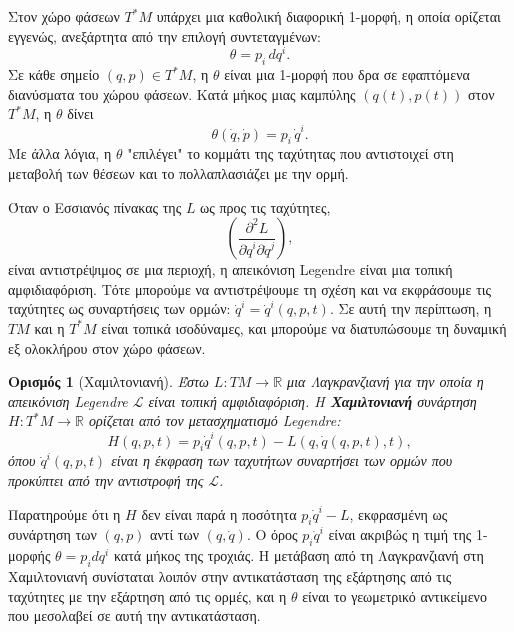 \documentclass[11pt,a4paper,twoside,openright]{book}
\newtheorem{definition}[lemma]{Ορισμός}
\begin{document}
Στον χώρο φάσεων $T^*M$ υπάρχει μια καθολική διαφορική 1-μορφή, η οποία ορίζεται εγγενώς, ανεξάρτητα από την επιλογή συντεταγμένων:
\begin{equation}
\theta = p_i \, dq^i.
\end{equation}
Σε κάθε σημείο $(q, p) \in T^*M$, η $\theta$ είναι μια 1-μορφή που δρα σε εφαπτόμενα διανύσματα του χώρου φάσεων. Κατά μήκος μιας καμπύλης $(q(t), p(t))$ στον $T^*M$, η $\theta$ δίνει
\begin{equation}
\theta(\dot{q}, \dot{p}) = p_i \, \dot{q}^i.
\end{equation}
Με άλλα λόγια, η $\theta$ "επιλέγει" το κομμάτι της ταχύτητας που αντιστοιχεί στη μεταβολή των θέσεων και το πολλαπλασιάζει με την ορμή.

Όταν ο Εσσιανός πίνακας της $L$ ως προς τις ταχύτητες,
\begin{equation}
\left( \frac{\partial^2 L}{\partial \dot{q}^i \partial \dot{q}^j} \right),
\end{equation}
είναι αντιστρέψιμος σε μια περιοχή, η απεικόνιση Legendre είναι μια τοπική αμφιδιαφόριση. Τότε μπορούμε να αντιστρέψουμε τη σχέση και να εκφράσουμε τις ταχύτητες ως συναρτήσεις των ορμών: $\dot{q}^i = \dot{q}^i(q, p, t)$. Σε αυτή την περίπτωση, η $TM$ και η $T^*M$ είναι τοπικά ισοδύναμες, και μπορούμε να διατυπώσουμε τη δυναμική εξ ολοκλήρου στον χώρο φάσεων.

\begin{definition}[Χαμιλτονιανή]
Έστω $L: TM \to \mathbb{R}$ μια Λαγκρανζιανή για την οποία η απεικόνιση Legendre $\mathcal{L}$ είναι τοπική αμφιδιαφόριση. Η \textbf{Χαμιλτονιανή} συνάρτηση $H: T^*M \to \mathbb{R}$ ορίζεται από τον μετασχηματισμό Legendre:
\begin{equation}
H(q, p, t) = p_i \dot{q}^i(q, p, t) - L(q, \dot{q}(q, p, t), t),
\end{equation}
όπου $\dot{q}^i(q, p, t)$ είναι η έκφραση των ταχυτήτων συναρτήσει των ορμών που προκύπτει από την αντιστροφή της $\mathcal{L}$.
\end{definition}

Παρατηρούμε ότι η $H$ δεν είναι παρά η ποσότητα $p_i \dot{q}^i - L$, εκφρασμένη ως συνάρτηση των $(q, p)$ αντί των $(q, \dot{q})$. Ο όρος $p_i \dot{q}^i$ είναι ακριβώς η τιμή της 1-μορφής $\theta = p_i dq^i$ κατά μήκος της τροχιάς. Η μετάβαση από τη Λαγκρανζιανή στη Χαμιλτονιανή συνίσταται λοιπόν στην αντικατάσταση της εξάρτησης από τις ταχύτητες με την εξάρτηση από τις ορμές, και η $\theta$ είναι το γεωμετρικό αντικείμενο που μεσολαβεί σε αυτή την αντικατάσταση.
\end{document}
